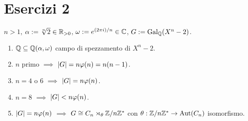 
\section{Esercizi 2}

\begin{eser}
\(n>1\), \(\alpha:=\sqrt[n]{2}\in\R_{>0}\), \(\omega:=e^{(2\pi i)/n}\in\C\), \(G:=\Gal[\Q]{X^n-2}\).
\begin{enumerate}
\item \(\Q\subseteq\Q(\alpha,\omega)\) campo di spezzamento di \(X^n-2\).
\item \(n\) primo \(\implies\) \(\card{G}=n\varphi(n)=n(n-1)\).
\item \(n=4\) o \(6\) \(\implies\) \(\card{G}=n\varphi(n)\).
\item \(n=8\) \(\implies\) \(\card{G}<n\varphi(n)\).
\item \(\card{G}=n\varphi(n)\) \(\implies\) \(G\iso C_n\rtimes_{\theta}\Z/n\Z^*\) con \(\theta : \Z/n\Z^*\to\Aut(C_n)\) isomorfismo.
\end{enumerate}
\end{eser}

